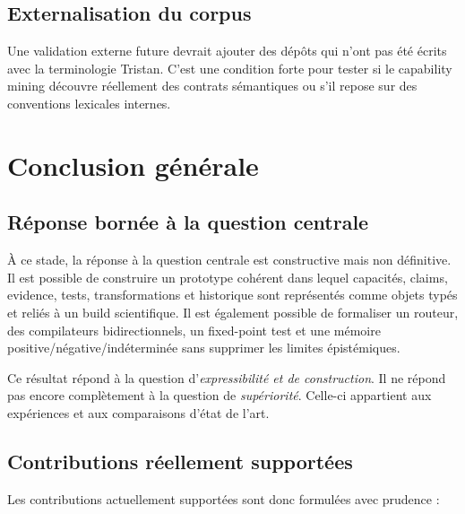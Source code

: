\section{Externalisation du corpus}

Une validation externe future devrait ajouter des dépôts qui n'ont pas été écrits avec la terminologie Tristan. C'est une condition forte pour tester si le capability mining découvre réellement des contrats sémantiques ou s'il repose sur des conventions lexicales internes.

\chapter{Conclusion générale}

\section{Réponse bornée à la question centrale}

À ce stade, la réponse à la question centrale est constructive mais non définitive. Il est possible de construire un prototype cohérent dans lequel capacités, claims, evidence, tests, transformations et historique sont représentés comme objets typés et reliés à un build scientifique. Il est également possible de formaliser un routeur, des compilateurs bidirectionnels, un fixed-point test et une mémoire positive/négative/indéterminée sans supprimer les limites épistémiques.

Ce résultat répond à la question d'\emph{expressibilité et de construction}. Il ne répond pas encore complètement à la question de \emph{supériorité}. Celle-ci appartient aux expériences et aux comparaisons d'état de l'art.

\section{Contributions réellement supportées}

Les contributions actuellement supportées sont donc formulées avec prudence :

